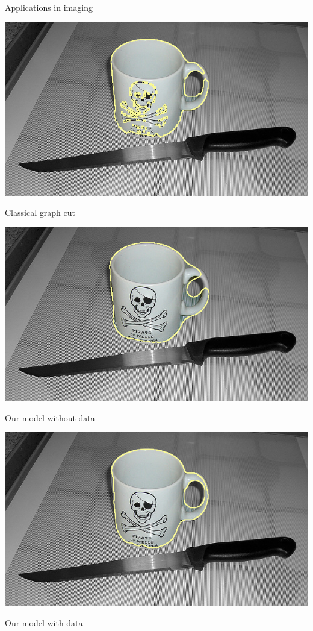 \begin{frame}
{Applications in imaging}

\begin{minipage}[t][0.45\textheight][t]{\textwidth}
\center
\includegraphics[scale=0.22]{figures/applications-imaging/contour-correction/cup/gc-seg.png}

Classical graph cut
\end{minipage}
\begin{minipage}[t][0.55\textheight][t]{0.5\textwidth}
\center
\includegraphics[scale=0.22]{figures/applications-imaging/contour-correction/cup/corrected-seg-without-data.png}

Our model without data
\end{minipage}%
\begin{minipage}[t][0.55\textheight][t]{0.5\textwidth}
\center
\includegraphics[scale=0.22]{figures/applications-imaging/contour-correction/cup/corrected-seg-with-data.png}

Our model with data
\end{minipage}%

\end{frame}


